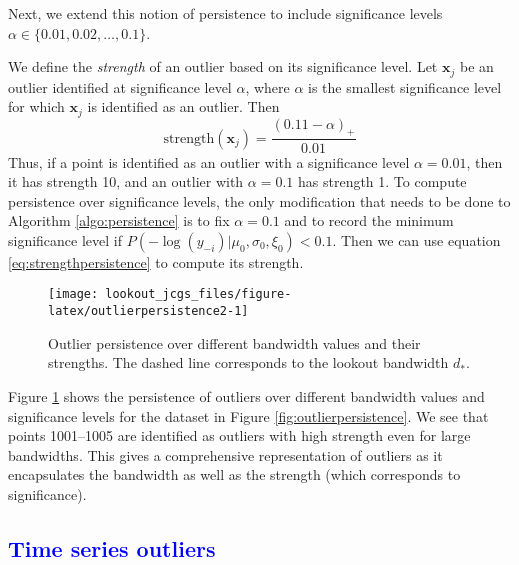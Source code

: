 \documentclass[12pt]{article}
\theoremstyle{definition}
\theoremstyle{definition}
\theoremstyle{definition}
\theoremstyle{definition}
\theoremstyle{remark}
\begin{document}
Next, we extend this notion of persistence to include significance levels \(\alpha \in \{0.01, 0.02, \dots, 0.1 \}\).

We define the \emph{strength} of an outlier based on its significance level. Let \(\bm{x}_j\) be an outlier identified at significance level \(\alpha\), where \(\alpha\) is the smallest significance level for which \(\bm{x}_j\) is identified as an outlier. Then
\begin{equation}\label{eq:strengthpersistence}
    \text{strength} (\bm{x}_j) = \frac{(0.11 - \alpha)_+}{0.01}
\end{equation}
Thus, if a point is identified as an outlier with a significance level \(\alpha = 0.01\), then it has strength 10, and an outlier with \(\alpha = 0.1\) has strength 1. To compute persistence over significance levels, the only modification that needs to be done to Algorithm \ref{algo:persistence} is to fix \(\alpha = 0.1\) and to record the minimum significance level if \(P\left(-\log(y_{-i})|\mu_0, \sigma_0, \xi_0 \right) < 0.1\).
Then we can use equation \eqref{eq:strengthpersistence} to compute its strength.

\begin{figure}

{\centering \texttt{[image: lookout\_jcgs\_files/figure-latex/outlierpersistence2-1]} 

}

\caption{Outlier persistence over different bandwidth values and their strengths. The dashed line corresponds to the lookout bandwidth $d_*$.}\label{fig:outlierpersistence2}
\end{figure}

Figure \ref{fig:outlierpersistence2} shows the persistence of outliers over different bandwidth values and significance levels for the dataset in Figure \ref{fig:outlierpersistence}. We see that points 1001--1005 are identified as outliers with high strength even for large bandwidths. This gives a comprehensive representation of outliers as it encapsulates the bandwidth as well as the strength (which corresponds to significance).

\hypertarget{sec:timeseriesoutiers}{%
\subsection{\texorpdfstring{\textcolor{blue}{Time series outliers}}{}}\label{sec:timeseriesoutiers}}
\end{document}
